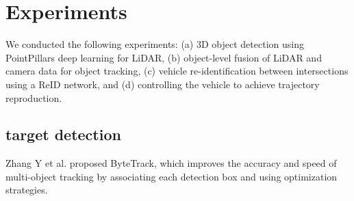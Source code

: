 \section{Experiments}

We conducted the following experiments: 
(a) 3D object detection using PointPillars deep learning for LiDAR, 
(b) object-level fusion of LiDAR and camera data for object tracking, 
(c) vehicle re-identification between intersections using a ReID network, and 
(d) controlling the vehicle to achieve trajectory reproduction.

\subsection{target detection}

Zhang Y et al. proposed ByteTrack, which improves the accuracy and speed of multi-object tracking by associating each detection box and using optimization strategies.\cite{Alpher22b}
